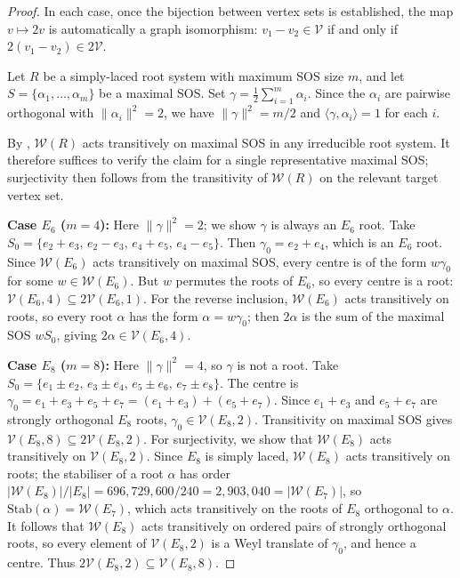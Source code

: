 \documentclass[11pt]{article}
\newcommand{\W}{\mathcal{W}}
\begin{document}
\begin{proof}
In each case, once the bijection between vertex sets is established, the map $v \mapsto 2v$ is automatically a graph isomorphism: $v_1 - v_2 \in \mathcal{V}$ if and only if $2(v_1 - v_2) \in 2\mathcal{V}$. 

Let $R$ be a simply-laced root system with maximum SOS size $m$, and let $S = \{\alpha_1, \ldots, \alpha_m\}$ be a maximal SOS. Set $\gamma = \frac{1}{2}\sum_{i=1}^m \alpha_i$. Since the $\alpha_i$ are pairwise orthogonal with $\|\alpha_i\|^2 = 2$, we have $\|\gamma\|^2 = m/2$ and $\langle \gamma, \alpha_i \rangle = 1$ for each $i$.

By \cite{Agaoka}, $\W(R)$ acts transitively on maximal SOS in any irreducible root system. It therefore suffices to verify the claim for a single representative maximal SOS; surjectivity then follows from the transitivity of $\W(R)$ on the relevant target vertex set.

\textbf{Case $E_6$ ($m = 4$):} Here $\|\gamma\|^2 = 2$; we show $\gamma$ is always an $E_6$ root. Take $S_0 = \{e_2 + e_3,\, e_2 - e_3,\, e_4 + e_5,\, e_4 - e_5\}$. Then $\gamma_0 = e_2 + e_4$, which is an $E_6$ root. Since $\W(E_6)$ acts transitively on maximal SOS, every centre is of the form $w\gamma_0$ for some $w \in \W(E_6)$. But $w$ permutes the roots of $E_6$, so every centre is a root: $\mathcal{V}(E_6, 4) \subseteq 2\mathcal{V}(E_6, 1)$. For the reverse inclusion, $\W(E_6)$ acts transitively on roots, so every root $\alpha$ has the form $\alpha = w\gamma_0$; then $2\alpha$ is the sum of the maximal SOS $wS_0$, giving $2\alpha \in \mathcal{V}(E_6, 4)$.

\textbf{Case $E_8$ ($m = 8$):} Here $\|\gamma\|^2 = 4$, so $\gamma$ is not a root. Take $S_0 = \{e_1 \pm e_2,\, e_3 \pm e_4,\, e_5 \pm e_6,\, e_7 \pm e_8\}$. The centre is $\gamma_0 = e_1 + e_3 + e_5 + e_7 = (e_1 + e_3) + (e_5 + e_7)$. Since $e_1 + e_3$ and $e_5 + e_7$ are strongly orthogonal $E_8$ roots, $\gamma_0 \in \mathcal{V}(E_8, 2)$. Transitivity on maximal SOS gives $\mathcal{V}(E_8, 8) \subseteq 2\mathcal{V}(E_8, 2)$. For surjectivity, we show that $\W(E_8)$ acts transitively on $\mathcal{V}(E_8, 2)$. Since $E_8$ is simply laced, $\W(E_8)$ acts transitively on roots; the stabiliser of a root $\alpha$ has order $|\W(E_8)|/|E_8| = 696{,}729{,}600/240 = 2{,}903{,}040 = |\W(E_7)|$, so $\mathrm{Stab}(\alpha) = \W(E_7)$, which acts transitively on the roots of $E_8$ orthogonal to $\alpha$. It follows that $\W(E_8)$ acts transitively on ordered pairs of strongly orthogonal roots, so every element of $\mathcal{V}(E_8, 2)$ is a Weyl translate of $\gamma_0$, and hence a centre. Thus $2\mathcal{V}(E_8, 2) \subseteq \mathcal{V}(E_8, 8)$.
\end{proof}
\end{document}
